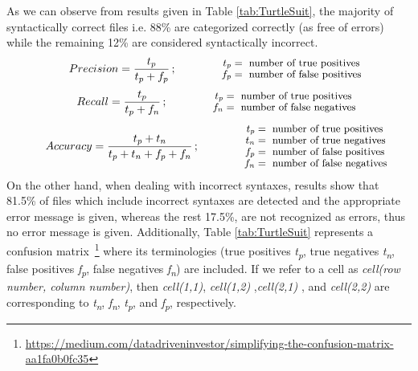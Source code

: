 As we can observe from results given in Table \ref{tab:TurtleSuit}, the majority of syntactically correct files i.e. 88\% are categorized correctly (as free of errors) while the remaining 12\% are considered syntactically incorrect.
\begin{align} 
   Precision=  \frac{t_p}{t_p+f_p}\,;\qquad
\qquad\parbox{4.0cm}{\footnotesize$\begin{aligned} t_p &= \text{ number of true positives}\\[-1.0ex] f_p &= \text{ number of false positives}\end{aligned}$}
   \label{eq:1}
\end{align}
\begin{align}
   Recall =  \frac{t_p}{t_p+f_n} \,;\qquad
\qquad\parbox{4.0cm}{\footnotesize$\begin{aligned} t_p &= \text{ number of true positives}\\[-1.0ex] f_n &= \text{ number of false negatives}\end{aligned}$}
   \label{eq:2}
\end{align}
\begin{align}
   Accuracy =  \frac{t_p+t_n}{t_p+t_n+f_p+f_n} \,;\qquad
\qquad\parbox{4.0cm}{\footnotesize$\begin{aligned} t_p &= \text{ number of true positives}\\[-1.0ex]
t_n &= \text{ number of true negatives}\\[-1.0ex]
f_p &= \text{ number of false positives}\\[-1.0ex]
f_n &= \text{ number of false negatives}\end{aligned}$}
   \label{eq:3}
\end{align}
On the other hand, when dealing with incorrect syntaxes, results show that 81.5\% of files which include incorrect syntaxes are detected and the appropriate error message is given, whereas the rest 17.5\%, are not recognized as errors, thus no error message is given. Additionally, Table \ref{tab:TurtleSuit}  represents a confusion matrix~\footnote{\url{https://medium.com/datadriveninvestor/simplifying-the-confusion-matrix-aa1fa0b0fc35}} where its terminologies (true positives \textit{t\textsubscript{p}}, true negatives \textit{t\textsubscript{n}},
false positives \textit{f\textsubscript{p}},
false negatives \textit{f\textsubscript{n}}) are included. If we refer to a cell as \emph{cell(row number, column number)}, then \emph{cell(1,1)}, \emph{cell(1,2)}  ,\emph{cell(2,1)} , and \emph{cell(2,2)} are corresponding to \textit{t\textsubscript{n}}, 
\textit{f\textsubscript{n}}, 
\textit{t\textsubscript{p}}, 
and \textit{f\textsubscript{p}},
respectively.

